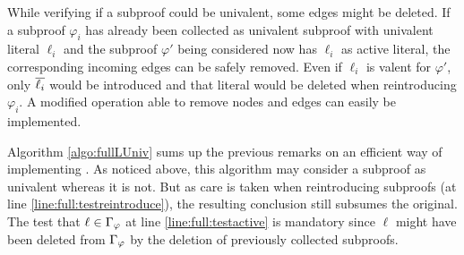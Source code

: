 \documentclass{llncs}
\begin{document}
While verifying if a subproof could be univalent, some edges might be deleted. If a
subproof $\varphi_i$ has already been collected as univalent subproof with univalent literal
$\ell_i$ and the subproof $\varphi'$ being considered now has $\ell_i$ as active literal, the
corresponding incoming edges can be safely removed. Even if $\ell_i$ is valent for $\varphi'$, only
$\overline{\ell_i}$ would be introduced and that literal would be deleted when reintroducing
$\varphi_i$. A modified  operation able to remove nodes and edges can easily be
implemented.

Algorithm \ref{algo:fullLUniv} sums up the previous remarks on an efficient way of implementing
{\LowerUnivalents}. As noticed above, this algorithm may consider a subproof as univalent whereas it
is not. But as care is taken when reintroducing subproofs (at line \ref{line:full:testreintroduce}),
the resulting conclusion still subsumes the original.  The test that $\ell \in \Gamma_{\varphi}$
at line \ref{line:full:testactive} is mandatory since $\ell$ might have been deleted from
$\Gamma_{\varphi}$ by the deletion of previously collected subproofs.
\end{document}

